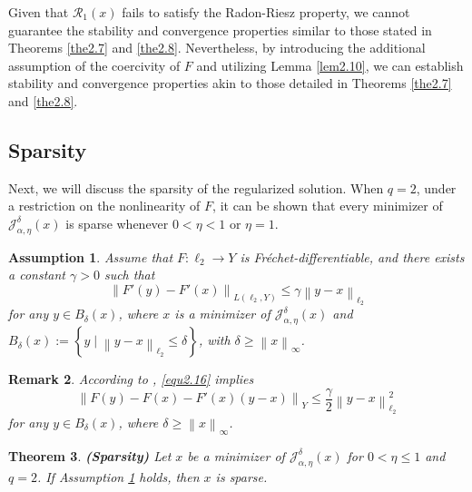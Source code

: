 \documentclass[a4paper,12pt]{article}
\newtheorem{theorem}{Theorem}[section]
\newtheorem{assumption}[theorem]{Assumption}
\newtheorem{remark}[theorem]{Remark}
\numberwithin{equation}{section}
\begin{document}
\par Given that $\mathcal{R}_{1}\left(x\right)$ fails to satisfy the Radon-Riesz property, we cannot guarantee the stability and convergence properties similar to those stated in Theorems \ref{the2.7} and \ref{the2.8}. Nevertheless, by introducing the additional assumption of the coercivity of $F$ and utilizing Lemma \ref{lem2.10}, we can establish stability and convergence properties akin to those detailed in Theorems \ref{the2.7} and \ref{the2.8}.

\subsection{Sparsity}\label{sec2.3}

\par Next, we will discuss the sparsity of the regularized solution. When $q=2$, under a restriction on the nonlinearity of $F$, it can be shown that every minimizer of $\mathcal{J}_{\alpha,\eta}^{\delta}\left(x\right)$ is sparse whenever $0<\eta<1$ or $\eta=1$.

\begin{assumption}\label{ass2.12}
    Assume that $F:\ell_{2}\rightarrow Y$ is Fr\'{e}chet-differentiable, and there exists a constant $\gamma>0$ such that  
    \begin{equation}\label{equ2.16}
        \left\|F'\left(y\right)-F'\left(x\right)\right\|_{L(\ell_{2}, Y)}\leq \gamma\left\|y-x\right\|_{\ell_{2}}
    \end{equation}
    for any $y\in B_{\delta}\left(x\right)$, where $x$ is a minimizer of $\mathcal{J}_{\alpha,\eta}^{\delta}\left(x\right)$ and $B_{\delta}\left(x\right):= \left\{y\mid \left\|y-x\right\|_{\ell_{2}}\leq \delta\right\}$, with $\delta\geq\left\|x \right\|_{\infty}$.
\end{assumption}

\begin{remark}\label{rem2.13}
    According to {\rm \cite[p.14]{JM12}}, \eqref{equ2.16} implies
    \begin{equation}\label{equ2.17}
        \left\|F\left(y\right)-F\left(x\right)-F'\left(x\right)\left(y-x\right) \right\|_{Y}\leq\frac{\gamma}{2}\left\|y-x\right\|_{\ell_{2}}^{2}
    \end{equation}
    for any $y\in B_{\delta}\left(x\right)$, where $\delta\geq\left\|x \right\|_{\infty}$.
\end{remark}

\begin{theorem}\label{the2.14}
    \textbf{(Sparsity)} Let $x$ be a minimizer of $\mathcal{J}_{\alpha,\eta}^{\delta} \left(x\right)$ for $0< \eta\leq 1$ and $q=2$. If Assumption \ref{ass2.12} holds, then $x$ is sparse.
\end{theorem}
\end{document}
